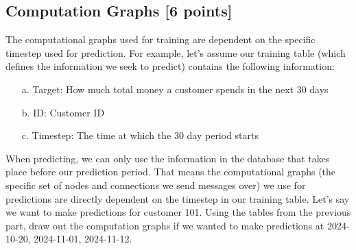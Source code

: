 \documentclass{article}
\numberwithin{figure}{section}
\begin{document}
\subsection{Computation Graphs [6 points]}
The computational graphs used for training are dependent on the specific timestep used for prediction. For example, let’s assume our training table (which defines the information we seek to predict) contains the following information:
\begin{enumerate}
    \item[a.] Target: How much total money a customer spends in the next 30 days
    \item[b.] ID: Customer ID
    \item[c.] Timestep: The time at which the 30 day period starts
\end{enumerate}
When predicting, we can only use the information in the database that takes place before our prediction period. That means the computational graphs (the specific set of nodes and connections we send messages over) we use for predictions are directly dependent on the timestep in our training table. Let’s say we want to make predictions for customer 101. Using the tables from the previous part, draw out the computation graphs if we wanted to make predictions at 2024-10-20, 2024-11-01, 2024-11-12. 
\end{document}
